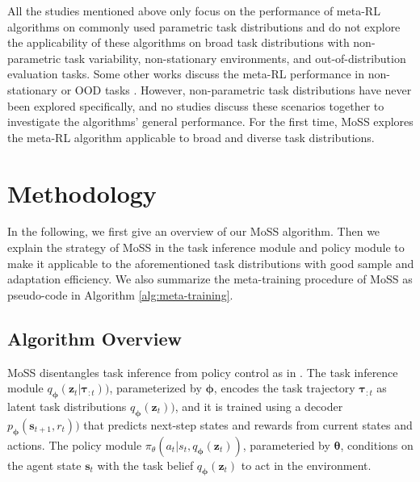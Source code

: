 \documentclass[letterpaper]{article} %
\begin{document}
All the studies mentioned above only focus on the performance of meta-RL algorithms on commonly used parametric task distributions and do not explore the applicability of these algorithms on broad task distributions with non-parametric task variability, non-stationary environments, and out-of-distribution evaluation tasks. Some other works discuss the meta-RL performance in non-stationary or OOD tasks \cite{learning-to-adapt, MQL, OOD-1, LDM}. However, non-parametric task distributions have never been explored specifically, and no studies discuss these scenarios together to investigate the algorithms’ general performance. For the first time, MoSS explores the meta-RL algorithm applicable to broad and diverse task distributions.


\section{Methodology}
In the following, we first give an overview of our MoSS algorithm. Then we explain the strategy of MoSS in the task inference module and policy module to make it applicable to the aforementioned task distributions with good sample and adaptation efficiency. We also summarize the meta-training procedure of MoSS as pseudo-code in Algorithm \ref{alg:meta-training}.



\subsection{Algorithm Overview}
\label{sec:Algorithm Overview}
MoSS disentangles task inference from policy control as in \cite{PEARL, VariBAD, MELD}. The task inference module $q_{\bm \phi}(\bm z_{t}| \bm \tau_{:t}))$, parameterized by $\bm \phi$, encodes the task trajectory $\bm \tau_{:t}$ as latent task distributions $q_{\bm \phi}(\bm z_{t}))$, and it is trained using a decoder $p_{\bm \phi}(\bm s_{t+1}, r_{t}))$ that predicts next-step states and rewards from current states and actions. The policy module $\pi_{\theta}(a_{t}|s_{t}, q_{\bm \phi}(\bm z_{t}))$, parameteried by $\bm \theta$, conditions on the agent state $\bm s_{t}$ with the task belief $q_{\bm \phi}(\bm z_{t})$ to act in the environment.
\end{document}
